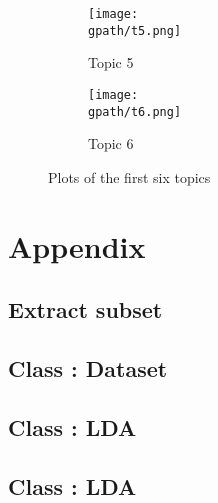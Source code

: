 \documentclass[12 pt,twopage]{article}
\begin{document}
\begin{figure}
 \begin{subfigure}[c]{1\textwidth}
  \caption{Topic 5}
  \centering
  \texttt{[image: \\gpath/t5.png]}
 \end{subfigure}
 \begin{subfigure}[c]{1\textwidth}
  \caption{Topic 6}
  \centering
  \texttt{[image: \\gpath/t6.png]}
 \end{subfigure}
 \caption{Plots of the first six topics}
 \label{fig:t56}
\end{figure}






\newpage




\newpage
\section{Appendix}
\subsection{Extract subset} \label{extract}


\subsection{Class : Dataset} \label{class:dataset}


\subsection{Class : LDA} \label{class:lda}


\subsection{Class : LDA} \label{code:generativeModel}

\end{document}
